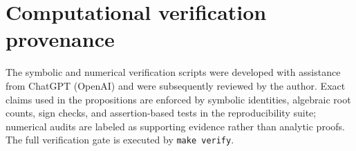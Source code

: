 \section*{Computational verification provenance}

The symbolic and numerical verification scripts were developed with assistance from ChatGPT (OpenAI) and were subsequently reviewed by the author. Exact claims used in the propositions are enforced by symbolic identities, algebraic root counts, sign checks, and assertion-based tests in the reproducibility suite; numerical audits are labeled as supporting evidence rather than analytic proofs. The full verification gate is executed by \texttt{make verify}.
